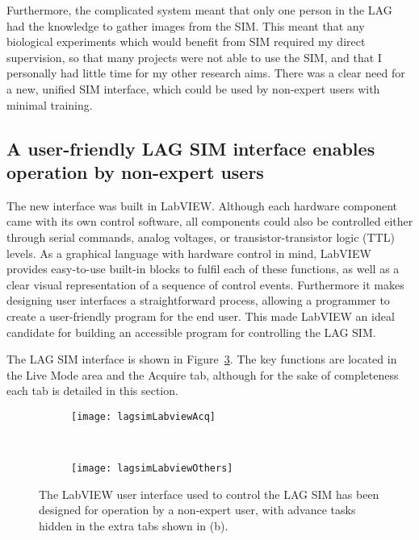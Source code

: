 Furthermore, the complicated system meant that only one person in the LAG had the knowledge to gather images from the SIM. 
This meant that any biological experiments which would benefit from SIM required my direct supervision, so that many projects were not able to use the SIM, and that I personally had little time for my other research aims.
There was a clear need for a new, unified SIM interface, which could be used by non-expert users with minimal training. 

\subsection{A user-friendly LAG SIM interface enables operation by non-expert users}
The new interface was built in LabVIEW. 
Although each hardware component came with its own control software, all components could also be controlled either through serial commands, analog voltages, or transistor-transistor logic (TTL) levels. 
As a graphical language with hardware control in mind, LabVIEW provides easy-to-use built-in blocks to fulfil each of these functions, as well as a clear visual representation of a sequence of control events.
Furthermore it makes designing user interfaces a straightforward process, allowing a programmer to create a user-friendly program for the end user. 
This made LabVIEW an ideal candidate for building an accessible program for controlling the LAG SIM.

The LAG SIM interface is shown in Figure~\ref{fig:lagsimLabview}.
The key functions are located in the Live Mode area and the Acquire tab, although for the sake of completeness each tab is detailed in this section. 

\begin{figure}[p]
\centering
\begin{subfigure}[b]{0.6\textwidth}
	\texttt{[image: lagsimLabviewAcq]}
	\caption{}\label{fig:fpbLabviewAcq}
\end{subfigure}

~\newline
\begin{subfigure}[b]{1.0\textwidth}
	\texttt{[image: lagsimLabviewOthers]}
	\caption{}\label{fig:fpbLabviewTabs}
\end{subfigure}
\caption[LAG SIM: The LabVIEW user interface for controlling LAG SIM is designed for operation by non-expert users]{The LabVIEW user interface used to control the LAG SIM has been designed for operation by a non-expert user, with advance tasks hidden in the extra tabs shown in (b). } %
\label{fig:lagsimLabview}
\end{figure}

